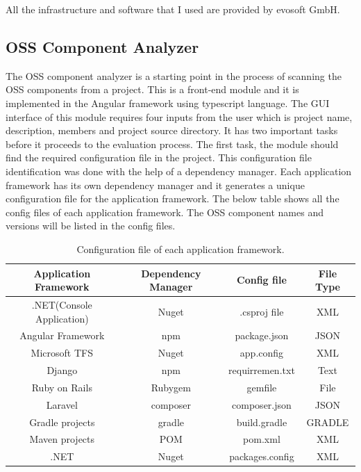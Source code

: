 All the infrastructure and software that I used are provided by evosoft GmbH.
\subsection{OSS Component Analyzer}
The \acs{OSS} component analyzer is a starting point in the process of scanning the \acs{OSS} components from a project. This is a front-end module and it is implemented in the Angular framework using typescript language. The GUI interface of this module requires four inputs from the user which is project name, description, members and project source directory. It has two important tasks before it proceeds to the evaluation process. The first task, the module should find the required configuration file in the project. This configuration file identification was done with the help of a dependency manager. Each application framework has its own dependency manager and it generates a unique configuration file for the application framework. The below table shows all the config files of each application framework. The \acs{OSS} component names and versions will be listed in the config files. 
\begin{table}[h!]
\begin{center}
 \begin{tabular}{ |c|c|c|c| } 
 	\hline
 	Application Framework & Dependency Manager & Config file & File Type \\
 	\hline
 	.NET(Console Application) & Nuget & .csproj file & XML \\ 
 	Angular Framework & npm & package.json & JSON \\ 
 	Microsoft TFS & Nuget & app.config & XML \\ 
 	Django & npm & requirremen.txt & Text\\ 
 	Ruby on Rails & Rubygem & gemfile & File \\ 
 	Laravel & composer & composer.json & JSON \\ 
 	Gradle projects & gradle & build.gradle & GRADLE \\ 
 	Maven projects & POM & pom.xml & XML \\ 
 	.NET & Nuget & packages.config & XML \\ 
 	\hline
 \end{tabular}
\caption{Configuration file of each application framework.}\label{tab:configFiles}
\end{center} 
\end{table}

